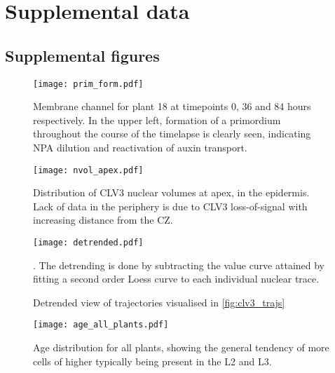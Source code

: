 
\ifpdf
\graphicspath{{Appendix2/Figs/Raster/}{Appendix2/Figs/PDF/}{Appendix2/Figs/}}
\else
\graphicspath{{Appendix2/Figs/Vector/}{Appendix2/Figs/}}
\fi

\chapter{Supplemental data}
\section{Supplemental figures}

\begin{figure}[H]
  \centering
  \texttt{[image: prim\_form.pdf]}
  \caption[NPA dilution causes primordia formation]{Membrane channel for plant
    18 at timepoints 0, 36 and 84 hours respectively. In the upper left,
    formation of a primordium throughout the course of the timelapse is clearly
    seen, indicating NPA dilution and reactivation of auxin transport.}
  \label{fig:NPA_primordia}
\end{figure}

\begin{figure}[H]
  \centering
  \texttt{[image: nvol\_apex.pdf]}
  \caption[Nuclear volumes at apex]{Distribution of CLV3 nuclear volumes at
    apex, in the epidermis. Lack of data in the periphery is due to CLV3
    loss-of-signal with increasing distance from the CZ. }
  \label{fig:nvol_apex}
\end{figure}

\begin{figure}[H]
  \centering
  \texttt{[image: detrended.pdf]}
  \caption[Detrended nuclear trajectories]{Detrended view of trajectories
    visualised in \cref{fig:clv3_trajs}}. The detrending is done by
  subtracting the value curve attained by fitting a second order Loess curve to
  each individual nuclear trace.
  \label{fig:detrended}
\end{figure}

\begin{figure}[H]
  \centering
  \texttt{[image: age\_all\_plants.pdf]}
  \caption[Age distribution, all plants]{Age distribution for all plants,
    showing the general tendency of more cells of higher typically being present
    in the L2 and L3.}
  \label{fig:age_all}
\end{figure}

